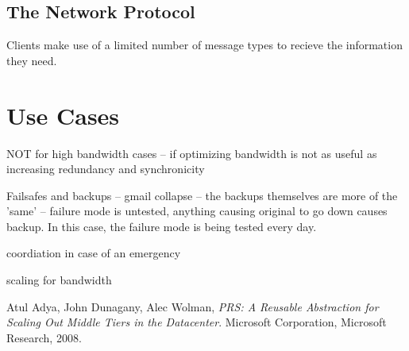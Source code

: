 \documentclass[11pt]{article}
\begin{document}
\subsection{The Network Protocol}
Clients make use of a limited number of message types to recieve the information they need.


\section{Use Cases}
NOT for high bandwidth cases -- if optimizing bandwidth is not as useful as increasing redundancy and synchronicity

Failsafes and backups -- gmail collapse -- the backups themselves are more of the 'same' -- failure mode is untested, anything causing original to go down causes backup.
In this case, the failure mode is being tested every day.

coordiation in case of an emergency

scaling for bandwidth



\begin{thebibliography}{1}

	  Atul Adya, John Dunagany, Alec Wolman,
	  \emph{PRS: A Reusable Abstraction for Scaling Out Middle Tiers in the Datacenter}.
	  Microsoft Corporation, Microsoft Research,
	  2008.
\end{thebibliography}
\end{document}
